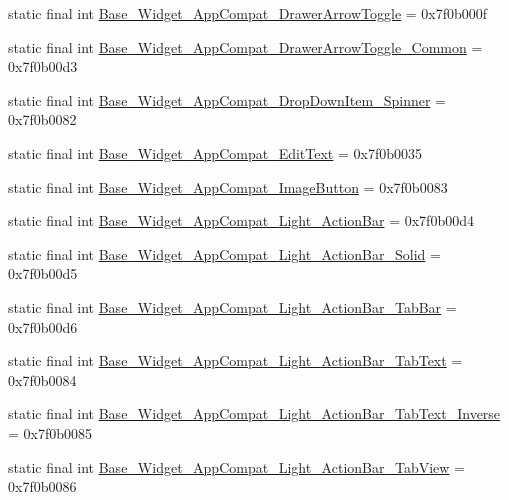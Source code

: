 \begin{CompactItemize}
static final int \hyperlink{classandroid_1_1support_1_1v7_1_1appcompat_1_1_r_1_1style_ea40bc2c71d44f76bf82429c28348651}{Base\_\-Widget\_\-AppCompat\_\-DrawerArrowToggle} = 0x7f0b000f
\item 
static final int \hyperlink{classandroid_1_1support_1_1v7_1_1appcompat_1_1_r_1_1style_f9bcee4066a9314e062eeecb0102a416}{Base\_\-Widget\_\-AppCompat\_\-DrawerArrowToggle\_\-Common} = 0x7f0b00d3
\item 
static final int \hyperlink{classandroid_1_1support_1_1v7_1_1appcompat_1_1_r_1_1style_28a629327056c567ce053b878e59f146}{Base\_\-Widget\_\-AppCompat\_\-DropDownItem\_\-Spinner} = 0x7f0b0082
\item 
static final int \hyperlink{classandroid_1_1support_1_1v7_1_1appcompat_1_1_r_1_1style_57d894559047cd0b1499bc0b11f756b9}{Base\_\-Widget\_\-AppCompat\_\-EditText} = 0x7f0b0035
\item 
static final int \hyperlink{classandroid_1_1support_1_1v7_1_1appcompat_1_1_r_1_1style_49b483f7d58cc716b6d4b9d4aca8dd2d}{Base\_\-Widget\_\-AppCompat\_\-ImageButton} = 0x7f0b0083
\item 
static final int \hyperlink{classandroid_1_1support_1_1v7_1_1appcompat_1_1_r_1_1style_e38b7060efb1b44777d7670aba4feae6}{Base\_\-Widget\_\-AppCompat\_\-Light\_\-ActionBar} = 0x7f0b00d4
\item 
static final int \hyperlink{classandroid_1_1support_1_1v7_1_1appcompat_1_1_r_1_1style_c44b9815f2ecc4e0531e865d5b733096}{Base\_\-Widget\_\-AppCompat\_\-Light\_\-ActionBar\_\-Solid} = 0x7f0b00d5
\item 
static final int \hyperlink{classandroid_1_1support_1_1v7_1_1appcompat_1_1_r_1_1style_8af7a813aad19871e1caa83358d4c95d}{Base\_\-Widget\_\-AppCompat\_\-Light\_\-ActionBar\_\-TabBar} = 0x7f0b00d6
\item 
static final int \hyperlink{classandroid_1_1support_1_1v7_1_1appcompat_1_1_r_1_1style_e6e61d2d9cd04064a33c421c6346f437}{Base\_\-Widget\_\-AppCompat\_\-Light\_\-ActionBar\_\-TabText} = 0x7f0b0084
\item 
static final int \hyperlink{classandroid_1_1support_1_1v7_1_1appcompat_1_1_r_1_1style_2ba0044d4c674929a3fc476a5d91109f}{Base\_\-Widget\_\-AppCompat\_\-Light\_\-ActionBar\_\-TabText\_\-Inverse} = 0x7f0b0085
\item 
static final int \hyperlink{classandroid_1_1support_1_1v7_1_1appcompat_1_1_r_1_1style_25c5a26e6a55202d232e45864754cc67}{Base\_\-Widget\_\-AppCompat\_\-Light\_\-ActionBar\_\-TabView} = 0x7f0b0086
\item 

\end{CompactItemize}
